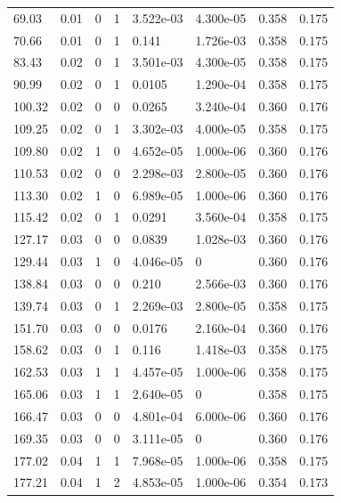 \documentclass[preview]{standalone}
\begin{document}
{{\begin{tabular}{L{1.2cm}C{1.2cm} C{0.3cm}C{0.5cm} C{1.4cm}C{1.4cm} C{1.4cm}C{1.4cm}}
  69.03  &  0.01  & 0     &  1 &  3.522e-03  & 4.300e-05  & 0.358 &  0.175   \\ 
  70.66  &  0.01  & 0     &  1 &  0.141  & 1.726e-03  & 0.358 &  0.175   \\ 
  83.43  &  0.02  & 0     &  1 &  3.501e-03  & 4.300e-05  & 0.358 &  0.175   \\ 
  90.99  &  0.02  & 0     &  1 &  0.0105  & 1.290e-04  & 0.358 &  0.175   \\ 
  100.32  &  0.02  & 0     &  0 &  0.0265  & 3.240e-04  & 0.360 &  0.176   \\ 
  109.25  &  0.02  & 0     &  1 &  3.302e-03  & 4.000e-05  & 0.358 &  0.175   \\ 
  109.80  &  0.02  & 1     &  0 &  4.652e-05  & 1.000e-06  & 0.360 &  0.176   \\ 
  110.53  &  0.02  & 0     &  0 &  2.298e-03  & 2.800e-05  & 0.360 &  0.176   \\ 
  113.30  &  0.02  & 1     &  0 &  6.989e-05  & 1.000e-06  & 0.360 &  0.176   \\ 
  115.42  &  0.02  & 0     &  1 &  0.0291  & 3.560e-04  & 0.358 &  0.175   \\ 
  127.17  &  0.03  & 0     &  0 &  0.0839  & 1.028e-03  & 0.360 &  0.176   \\ 
  129.44  &  0.03  & 1     &  0 &  4.046e-05  & 0  & 0.360 &  0.176   \\ 
  138.84  &  0.03  & 0     &  0 &  0.210  & 2.566e-03  & 0.360 &  0.176   \\ 
  139.74  &  0.03  & 0     &  1 &  2.269e-03  & 2.800e-05  & 0.358 &  0.175   \\ 
  151.70  &  0.03  & 0     &  0 &  0.0176  & 2.160e-04  & 0.360 &  0.176   \\ 
  158.62  &  0.03  & 0     &  1 &  0.116  & 1.418e-03  & 0.358 &  0.175   \\ 
  162.53  &  0.03  & 1     &  1 &  4.457e-05  & 1.000e-06  & 0.358 &  0.175   \\ 
  165.06  &  0.03  & 1     &  1 &  2.640e-05  & 0  & 0.358 &  0.175   \\ 
  166.47  &  0.03  & 0     &  0 &  4.801e-04  & 6.000e-06  & 0.360 &  0.176   \\ 
  169.35  &  0.03  & 0     &  0 &  3.111e-05  & 0  & 0.360 &  0.176   \\ 
  177.02  &  0.04  & 1     &  1 &  7.968e-05  & 1.000e-06  & 0.358 &  0.175   \\ 
  177.21  &  0.04  & 1     &  2 &  4.853e-05  & 1.000e-06  & 0.354 &  0.173   \\ 

\end{tabular}}}
\end{document}
